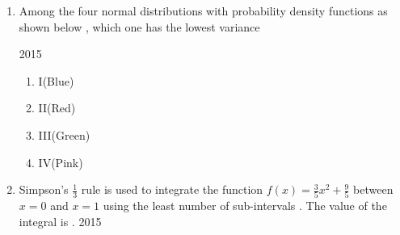\documentclass[journal]{IEEEtran}
\begin{document}
\begin{enumerate}
  \item Among the four normal distributions with probability density functions as shown below , which one has the lowest variance
  
  \hfill{2015}
  
\begin{enumerate}
    \item I(Blue)
    \item II(Red)
    \item III(Green)
    \item IV(Pink)
\end{enumerate}

\item Simpson's $\frac{1}{3}$ rule is used to integrate the function $f(x)=\frac{3}{5}x^2+\frac{9}{5}$ between $x=0$ and $x=1$ using the least number of sub-intervals . The value of the integral is .
\hfill{2015}




\end{enumerate}
\end{document}
